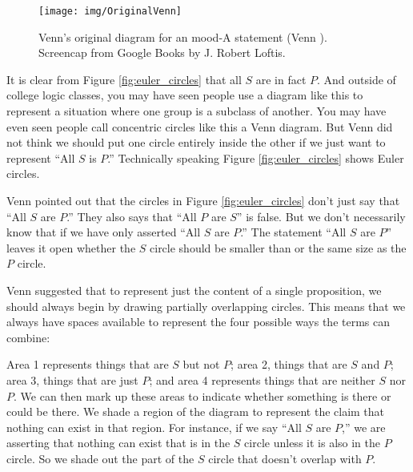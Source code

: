 \begin{figure}
\begin{mdframed}[style=mytableclearbox, userdefinedwidth=.3\textwidth]
\begin{center}
\texttt{[image: img/OriginalVenn]}
\end{center}
\end{mdframed}
\caption{Venn's original diagram for an mood-A statement (Venn \cite*{Venn1880a}). Screencap from Google Books by J.  Robert Loftis.}
\end{figure}


It is clear from Figure \ref{fig:euler_circles} that all $S$ are in fact $P$. And outside of college logic classes, you may have seen people use a diagram like this to represent a situation where one group is a subclass of another. You may have even seen people call concentric circles like this a Venn diagram. But Venn did not think we should put one circle entirely inside the other if we just want to represent ``All $S$ is $P$.'' Technically speaking Figure \ref{fig:euler_circles} shows Euler circles.

Venn pointed out that the circles in Figure \ref{fig:euler_circles} don't just say that ``All $S$ are $P$.'' They also says that ``All $P$ are $S$'' is false. But we don't necessarily know that if we have only asserted ``All $S$ are $P$.'' The statement ``All $S$ are $P$'' leaves it open whether the $S$ circle should be smaller than or the same size as the $P$ circle.

Venn suggested that to represent just the content of a single proposition, we should always begin by drawing partially overlapping circles. This means that we always have spaces available to represent the four possible ways the terms can combine:

\begin{center}
\label{fig:two_circle_venn}
\end{center}

Area 1 represents things that are $S$ but not $P$; area 2, things that are $S$ and $P$; area 3, things that are just $P$; and area 4 represents things that are neither $S$ nor $P$. We can then mark up these areas to indicate whether something is there or could be there. We shade a region of the diagram to represent the claim that nothing can exist in that region. For instance, if we say ``All $S$ are $P$,'' we are asserting that nothing can exist that is in the $S$ circle unless it is also in the $P$ circle. So we shade out the part of the $S$ circle that doesn't overlap with $P$.

